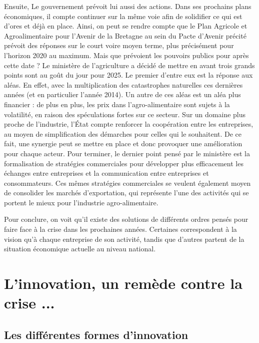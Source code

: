 \documentclass[a4paper,12pt]{report}
\begin{document}
			Ensuite, Le gouvernement prévoit lui aussi des actions. Dans ses prochains plans économiques, il compte continuer sur la même voie afin de solidifier ce qui est d’ores et déjà en place. Ainsi, on peut se rendre compte que le Plan Agricole et Agroalimentaire pour l’Avenir de la Bretagne au sein du Pacte d’Avenir précité prévoit des réponses sur le court voire moyen terme, plus précisément pour l’horizon 2020 au maximum. Mais que prévoient les pouvoirs publics pour après cette date ? Le ministère de l’agriculture a décidé de mettre en avant trois grands points sont au goût du jour pour 2025\cite{AvenirFiliereAgricole2025}. Le premier d’entre eux est la réponse aux aléas. En effet, avec la multiplication des catastrophes naturelles ces dernières années (et en particulier l’année 2014). Un autre de ces aléas est un aléa plus financier : de plus en plus, les prix dans l’agro-alimentaire sont sujets à la volatilité, en raison des spéculations fortes sur ce secteur. Sur un domaine plus proche de l’industrie, l’État compte renforcer la coopération entre les entreprises, au moyen de simplification des démarches pour celles qui le souhaitent. De ce fait, une synergie peut se mettre en place et donc provoquer une amélioration pour chaque acteur. Pour terminer, le dernier point pensé par le ministère est la formalisation de stratégies commerciales pour développer plus efficacement les échanges entre entreprises et la communication entre entreprises et consommateurs. Ces mêmes stratégies commerciales se veulent également moyen de consolider les marchés d’exportation, qui représente l’une des activités qui se portent le mieux pour l’industrie agro-alimentaire.
			
			Pour conclure, on voit qu’il existe des solutions de différents ordres pensés pour faire face à la crise dans les prochaines années. Certaines correspondent à la vision qu’à chaque entreprise de son activité, tandis que d’autres partent de la situation économique actuelle au niveau national.
			
\chapter{L'innovation, un remède contre la crise ...}
	
	\section{Les différentes formes d'innovation}
	
\end{document}
